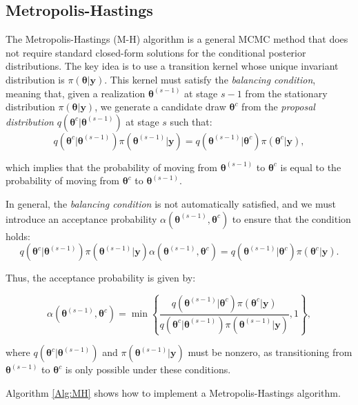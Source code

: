 \subsection{Metropolis-Hastings}\label{sec512}

The Metropolis-Hastings (M-H) algorithm \cite{metropolis53,hastings70} is a general MCMC method that does not require standard closed-form solutions for the conditional posterior distributions. The key idea is to use a transition kernel whose unique invariant distribution is $\pi(\bm{\theta} | \bm{y})$. This kernel must satisfy the \textit{balancing condition}, meaning that, given a realization $\bm{\theta}^{(s-1)}$ at stage $s-1$ from the stationary distribution $\pi(\bm{\theta} | \bm{y})$, we generate a candidate draw $\bm{\theta}^{c}$ from the \textit{proposal distribution} $q(\bm{\theta}^{c} | \bm{\theta}^{(s-1)})$ at stage $s$ such that:
\[
q(\bm{\theta}^{c} | \bm{\theta}^{(s-1)}) \pi(\bm{\theta}^{(s-1)} | \bm{y}) = q(\bm{\theta}^{(s-1)} | \bm{\theta}^{c}) \pi(\bm{\theta}^{c} | \bm{y}),
\]

which implies that the probability of moving from $\bm{\theta}^{(s-1)}$ to $\bm{\theta}^{c}$ is equal to the probability of moving from $\bm{\theta}^{c}$ to $\bm{\theta}^{(s-1)}$.

In general, the \textit{balancing condition} is not automatically satisfied, and we must introduce an acceptance probability $\alpha(\bm{\theta}^{(s-1)}, \bm{\theta}^{c})$ to ensure that the condition holds:
\[
q(\bm{\theta}^{c} | \bm{\theta}^{(s-1)}) \pi(\bm{\theta}^{(s-1)} | \bm{y}) \alpha(\bm{\theta}^{(s-1)}, \bm{\theta}^{c}) = q(\bm{\theta}^{(s-1)} | \bm{\theta}^{c}) \pi(\bm{\theta}^{c} | \bm{y}).
\]

Thus, the acceptance probability is given by:

\[
\alpha(\bm{\theta}^{(s-1)}, \bm{\theta}^{c}) = 
\min\left\{\frac{q(\bm{\theta}^{(s-1)} | \bm{\theta}^{c}) \pi(\bm{\theta}^{c} | \bm{y})}{q(\bm{\theta}^{c} | \bm{\theta}^{(s-1)}) \pi(\bm{\theta}^{(s-1)} | \bm{y})}, 1\right\},
\]

where $q(\bm{\theta}^{c} | \bm{\theta}^{(s-1)})$ and $\pi(\bm{\theta}^{(s-1)} | \bm{y})$ must be nonzero, as transitioning from $\bm{\theta}^{(s-1)}$ to $\bm{\theta}^{c}$ is only possible under these conditions.

Algorithm \ref{Alg:MH} shows how to implement a Metropolis-Hastings algorithm. 

